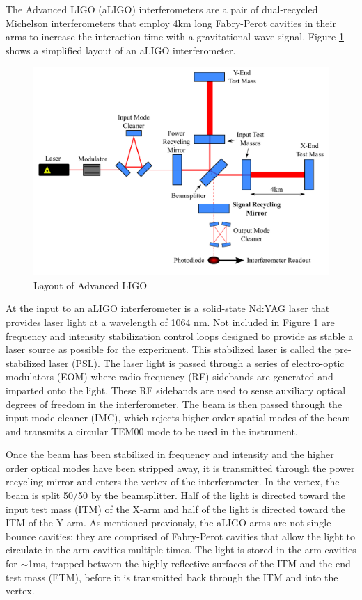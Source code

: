 The Advanced LIGO (aLIGO) interferometers are a pair of dual-recycled Michelson interferometers 
that employ 4km long Fabry-Perot cavities in their arms to increase the interaction time with a 
gravitational wave signal. 
Figure \ref{fig:aligo} shows a simplified layout of an aLIGO interferometer. 

\begin{figure}[ht!]
\includegraphics[width=\textwidth]{figures/introduction/ALIGO_layout}
\caption[Layout of Advanced LIGO]{Layout of Advanced LIGO}
\label{fig:aligo}
\end{figure}

At the input to an aLIGO interferometer is a solid-state Nd:YAG laser that provides laser light 
at a wavelength of 1064 nm. Not included in Figure \ref{fig:aligo} are frequency and 
intensity stabilization control loops designed to provide as stable a laser source as 
possible for the experiment. This stabilized laser is called the pre-stabilized laser 
(PSL). The laser light is passed through a series of 
electro-optic modulators (EOM) where radio-frequency (RF) sidebands are generated 
and imparted onto the light. These RF sidebands are used to sense auxiliary optical 
degrees of freedom in the interferometer. The beam is then passed through the 
input mode cleaner (IMC), which rejects higher order spatial modes of the beam 
and transmits a circular TEM00 mode to be used in the instrument.

Once the beam has been stabilized in frequency and intensity and the higher order 
optical modes have been stripped away, it is transmitted through the power 
recycling mirror and enters the vertex of the interferometer. In the vertex, 
the beam is split 50/50 by the beamsplitter. Half of the light is directed toward  
the input test mass (ITM) of the X-arm and half of the light is directed  
toward the ITM of the Y-arm. As mentioned previously, the aLIGO arms are not 
single bounce cavities; they are comprised of Fabry-Perot cavities that allow the 
light to circulate in the arm cavities multiple times. The light is stored in 
the arm cavities for $\sim$1ms, trapped between the highly reflective surfaces 
of the ITM and the end test mass (ETM), before it is transmitted back through 
the ITM and into the vertex.


